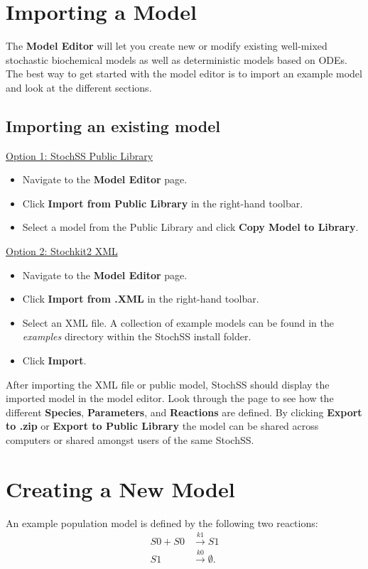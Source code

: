 \section{Importing a Model}
The \textbf{Model Editor} will let you create new or modify existing well-mixed stochastic biochemical models as well as deterministic models based on ODEs.
The best way to get started with the model editor is to import an example model and look at the different sections.

\subsection{Importing an existing model}

\underline{Option 1: StochSS Public Library}
\begin{itemize}
  \item Navigate to the \textbf{Model Editor} page.
  \item Click \textbf{Import from Public Library} in the right-hand toolbar.
  \item Select a model from the Public Library and click \textbf{Copy Model to Library}.
\end{itemize}

\noindent\underline{Option 2: Stochkit2 XML}
\begin{itemize}
  \item Navigate to the \textbf{Model Editor} page.
  \item Click \textbf{Import from .XML} in the right-hand toolbar.
  \item Select an XML file. A collection of example models can be found in the \textit{examples} directory within the StochSS install folder.
  \item Click \textbf{Import}.
\end{itemize}

After importing the XML file or public model, StochSS should display the imported model in the model editor.
Look through the page to see how the different \textbf{Species}, \textbf{Parameters}, and \textbf{Reactions} are defined.
By clicking \textbf{Export to .zip} or \textbf{Export to Public Library} the model can be shared across computers or shared amongst users of the same StochSS.

\section{Creating a New Model}
An example population model is defined by the following two reactions:
\begin{equation}
\label{eq:tut1-reac1}
\begin{aligned}
S0 + S0 &\xrightarrow{k1} S1\\
S1 &\xrightarrow{k0} \emptyset .  
\end{aligned}
\end{equation}

